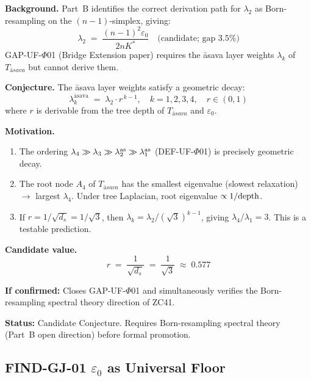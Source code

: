 \documentclass[12pt, a4paper]{article}
\providecommand{\eps}{\varepsilon_0}
\providecommand{\ltwo}{\lambda_2}
\providecommand{\Tasava}{T_{\bar{\mathrm{a}}sava}}
\providecommand{\lk}{\lambda_k^{\mathrm{\bar{a}sava}}}
\providecommand{\Tasava}{\mathcal{T}_{\!\mathrm{\bar{a}sava}}}
\begin{document}
\begin{formalbox}[title={CONJ-GI-01: Spectral Bridge ---
  $\lk$ from $\ltwo$ (Candidate)}]
\textbf{Background.}
Part~B identifies the correct derivation path for $\ltwo$
as Born-resampling on the $(n{-}1)$-simplex, giving:
\[
  \ltwo \;=\; \frac{(n-1)^2\eps}{2nK^*}
  \quad \text{(candidate; gap 3.5\%)}
\]
GAP-UF-$\Phi$01 (Bridge Extension paper) requires the
\={a}sava layer weights $\lambda_k$ of $\Tasava$ but
cannot derive them.

\textbf{Conjecture.}
The \={a}sava layer weights satisfy a geometric decay:
\[
  \lk \;=\; \ltwo \cdot r^{\,k-1},
  \quad k = 1, 2, 3, 4, \quad r \in (0,1)
\]
where $r$ is derivable from the tree depth of $\Tasava$
and $\eps$.

\textbf{Motivation.}
\begin{enumerate}[leftmargin=*, noitemsep]
\item The ordering $\lambda_4 \gg \lambda_3 \gg
  \lambda_2^{\rm as} \gg \lambda_1^{\rm as}$
  (DEF-UF-$\Phi$01) is precisely geometric decay.
\item The root node $A_4$ of $\Tasava$ has the smallest
  eigenvalue (slowest relaxation) $\to$ largest $\lambda_4$.
  Under tree Laplacian, root eigenvalue $\propto 1/{\rm depth}$.
\item If $r = 1/\sqrt{d_s} = 1/\sqrt{3}$, then
  $\lambda_k = \ltwo / (\sqrt{3})^{k-1}$, giving
  $\lambda_4/\lambda_1 = 3$. This is a testable prediction.
\end{enumerate}

\textbf{Candidate value.}
\[
  r \;=\; \frac{1}{\sqrt{d_s}} \;=\; \frac{1}{\sqrt{3}}
  \;\approx\; 0.577
\]

\textbf{If confirmed:}
Closes GAP-UF-$\Phi$01 and simultaneously verifies the
Born-resampling spectral theory direction of ZC41.

\textbf{Status:} Candidate Conjecture.
Requires Born-resampling spectral theory (Part~B open
direction) before formal promotion.
\end{formalbox}

\subsection{FIND-GJ-01 \quad \texorpdfstring{$\varepsilon_0$}{0} as Universal Floor}

\end{document}
